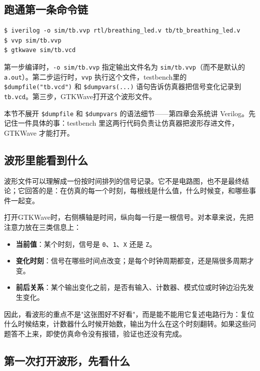 \documentclass[11pt,a4paper]{article}
\begin{document}
\subsection{跑通第一条命令链}

\begin{lstlisting}[style=shell]
$ iverilog -o sim/tb.vvp rtl/breathing_led.v tb/tb_breathing_led.v
$ vvp sim/tb.vvp
$ gtkwave sim/tb.vcd
\end{lstlisting}

第一步编译时，\texttt{-o sim/tb.vvp} 指定输出文件名为 \texttt{sim/tb.vvp}（而不是默认的 \texttt{a.out}）。第二步运行时，\texttt{vvp} 执行这个文件，testbench里的 \texttt{\$dumpfile("tb.vcd")} 和 \texttt{\$dumpvars(...)} 语句告诉仿真器把信号变化记录到 \texttt{tb.vcd}。第三步，GTKWave打开这个波形文件。

本节不展开 \texttt{\$dumpfile} 和 \texttt{\$dumpvars} 的语法细节——第四章会系统讲 Verilog。先记住一件具体的事：testbench 里这两行代码负责让仿真器把波形存进文件，GTKWave 才能打开。

\subsection{波形里能看到什么}

波形文件可以理解成一份按时间排列的信号记录。它不是电路图，也不是最终结论；它回答的是：在仿真的每一个时刻，每根线是什么值，什么时候变，和哪些事件一起变。

打开GTKWave时，右侧横轴是时间，纵向每一行是一根信号。对本章来说，先把注意力放在三类信息上：

\begin{itemize}
  \item \textbf{当前值}：某个时刻，信号是 \texttt{0}、\texttt{1}、\texttt{X} 还是 \texttt{Z}。
  \item \textbf{变化时刻}：信号在哪些时间点改变；是每个时钟周期都变，还是隔很多周期才变。
  \item \textbf{前后关系}：某个输出变化之前，是否有输入、计数器、模式位或时钟边沿先发生变化。
\end{itemize}

因此，看波形的重点不是"这张图好不好看"，而是能不能用它复述电路行为：复位什么时候结束，计数器什么时候开始数，输出为什么在这个时刻翻转。如果这些问题答不上来，即使仿真命令没有报错，验证也还没有完成。

\subsection{第一次打开波形，先看什么}
\end{document}
